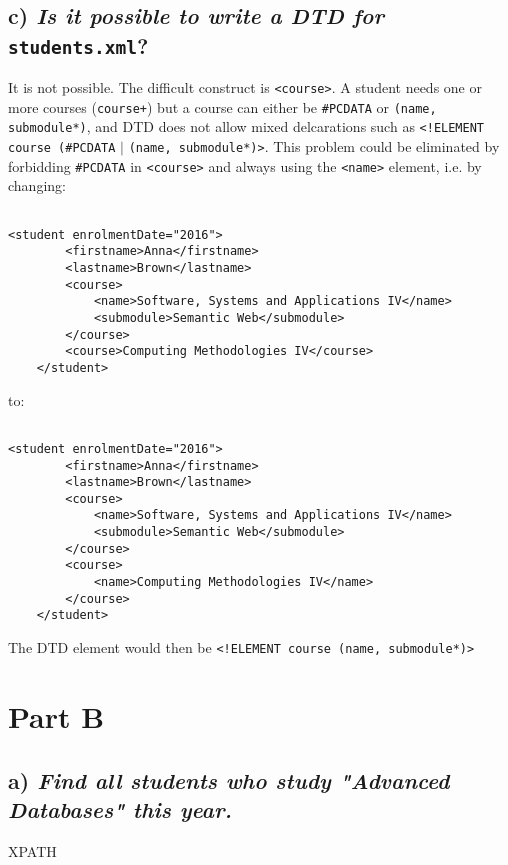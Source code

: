 \documentclass[11pt]{article} %
\begin{document}
\subsection*{c) \textit{Is it possible to write a DTD for} \texttt{students.xml}?}

It is not possible. The difficult construct is \verb|<course>|. A student needs one or more courses (\verb|course+|) but a course can either be \verb|#PCDATA| or \verb|(name, submodule*)|, and DTD does not allow mixed delcarations such as \verb|<!ELEMENT course (#PCDATA| $|$ \verb|(name, submodule*)>|. This problem could be eliminated by forbidding \verb|#PCDATA| in \verb|<course>| and always using the \verb|<name>| element, i.e. by changing:

\begin{verbatim}

<student enrolmentDate="2016">
        <firstname>Anna</firstname>
        <lastname>Brown</lastname>
        <course>
            <name>Software, Systems and Applications IV</name>
            <submodule>Semantic Web</submodule>
        </course>
        <course>Computing Methodologies IV</course>
    </student>

\end{verbatim}

to:

\begin{verbatim}

<student enrolmentDate="2016">
        <firstname>Anna</firstname>
        <lastname>Brown</lastname>
        <course>
            <name>Software, Systems and Applications IV</name>
            <submodule>Semantic Web</submodule>
        </course>
        <course>
            <name>Computing Methodologies IV</name>
        </course>
    </student>

\end{verbatim}

The DTD element would then be \verb|<!ELEMENT course (name, submodule*)>|

\section*{Part B}

\subsection*{a) \textit{Find all students who study "Advanced Databases" this year.}}

XPATH
\end{document}
